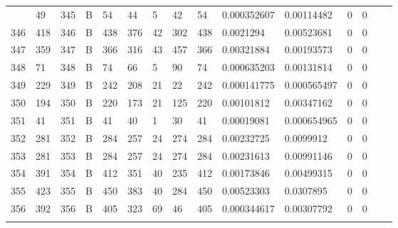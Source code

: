 \begin{longtable}{lllllllllllllll}
\begin{comment}
	345 & 49                & 345 & B   & 54                & 44                & 5                 & 42   & 54         & 0.000352607    & 0.00114482     & 0             & 0            \\
	346 & 418               & 346 & B   & 438               & 376               & 42                & 302  & 438        & 0.0021294      & 0.00523681     & 0             & 0            \\
	347 & 359               & 347 & B   & 366               & 316               & 43                & 457  & 366        & 0.00321884     & 0.00193573     & 0             & 0            \\
	348 & 71                & 348 & B   & 74                & 66                & 5                 & 90   & 74         & 0.000635203    & 0.00131814     & 0             & 0            \\
	349 & 229               & 349 & B   & 242               & 208               & 21                & 22   & 242        & 0.000141775    & 0.000565497    & 0             & 0            \\
	350 & 194               & 350 & B   & 220               & 173               & 21                & 125  & 220        & 0.00101812     & 0.00347162     & 0             & 0            \\
	351 & 41                & 351 & B   & 41                & 40                & 1                 & 30   & 41         & 0.00019081     & 0.000654965    & 0             & 0            \\
	352 & 281               & 352 & B   & 284               & 257               & 24                & 274  & 284        & 0.00232725     & 0.0099912      & 0             & 0            \\
	353 & 281               & 353 & B   & 284               & 257               & 24                & 274  & 284        & 0.00231613     & 0.00991146     & 0             & 0            \\
	354 & 391               & 354 & B   & 412               & 351               & 40                & 235  & 412        & 0.00173846     & 0.00499315     & 0             & 0            \\
	355 & 423               & 355 & B   & 450               & 383               & 40                & 284  & 450        & 0.00523303     & 0.0307895      & 0             & 0            \\
	356 & 392               & 356 & B   & 405               & 323               & 69                & 46   & 405        & 0.000344617    & 0.00307792     & 0             & 0            \\

\end{comment}
\end{longtable}
